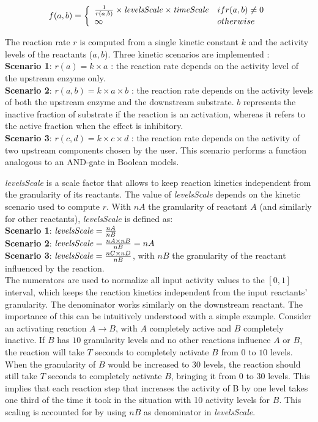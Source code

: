 \documentclass[journal, 10pt]{IEEEtran}
\begin{document}
$$
f(a, b) = \left\{ \begin{array}{ll}
		      \frac{1}{r(a, b)} \times \mbox{\it levelsScale} \times \mbox{\it timeScale} & \mbox{ if } r(a, b) \neq 0 \\
		      \infty & \mbox{ otherwise}
                  \end{array} \right.
$$


The reaction rate $r$ is computed from a single kinetic constant $k$ and the activity levels of the reactants ($a, b$). Three kinetic scenarios are implemented :\\
{\bf Scenario 1}: $r(a) = k \times a$ : the reaction rate depends on the activity level of the upstream enzyme only. \\
{\bf Scenario 2}: $r(a, b) = k \times a \times b$ : the reaction rate depends on the activity levels of both the upstream enzyme and the
downstream substrate. $b$ represents the inactive fraction of substrate if the reaction
is an activation, whereas it refers to the active fraction when the effect is inhibitory.\\
{\bf Scenario 3}: $r(c, d) = k \times c \times d$ : the reaction rate depends on the activity of two upstream components chosen by the user. This scenario performs a function analogous to an AND-gate in Boolean models.

{\it levelsScale} is a scale factor that allows to keep reaction kinetics independent from the granularity of its reactants. 
The value of {\it levelsScale} depends on the kinetic scenario used to compute $r$. With $nA$ the granularity of reactant $A$
(and similarly for other reactants), {\it levelsScale} is defined as:\\
{\bf Scenario 1}: $\mbox{\it levelsScale} = \frac{nA}{nB}$\\[1ex]
{\bf Scenario 2}: $\mbox{\it levelsScale} = \frac{nA \times nB}{nB} = nA$\\[1ex]
{\bf Scenario 3}: $\mbox{\it levelsScale} = \frac{nC \times nD}{nB}$, with $nB$ the granularity of the reactant influenced by the reaction.\\
The numerators are used to normalize all input activity values to the $[0, 1]$ interval, which keeps the reaction
kinetics independent from the input reactants' granularity. The denominator works similarly on the downstream reactant.
The importance of this can be intuitively understood with a simple example.
Consider an activating reaction $A \rightarrow B$, with $A$ completely
active and $B$ completely inactive. If $B$ has $10$ granularity levels and no other reactions influence $A$ or $B$,
the reaction will take $T$ seconds to completely activate $B$ from $0$ to $10$ levels. When the granularity of $B$ would be increased to
$30$ levels, the reaction should still take $T$ seconds to completely activate $B$, bringing it
from $0$ to $30$ levels. This implies that each reaction step that increases the activity of B by one level takes one third 
of the time it took in the situation with 10 activity levels for $B$. This scaling is accounted for by using $nB$ as denominator in {\it levelsScale}.
\end{document}
